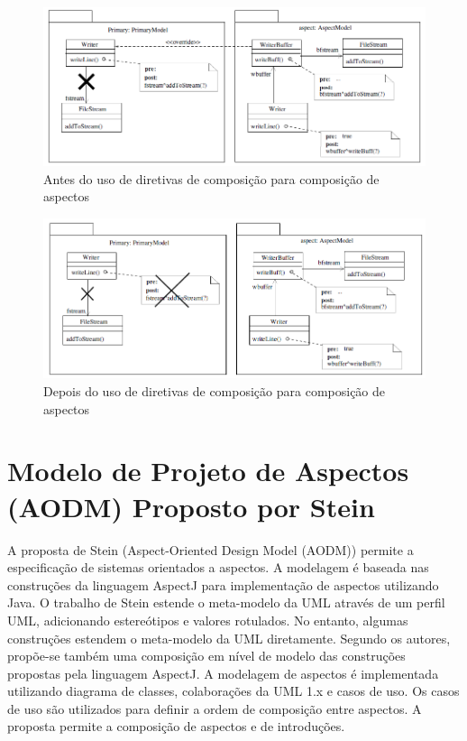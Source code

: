 \begin{landscape}
\begin{figure}
	\centering
	\includegraphics[scale=0.8]{img/clarke_1.png}
	\caption{Antes do uso de diretivas de composição para composição de aspectos}\label{fig:clarke_1}
\end{figure}
\end{landscape}

\begin{landscape}
\begin{figure}
	\centering
	\includegraphics[scale=0.8]{img/clarke_2.png}
	\caption{Depois do uso de diretivas de composição para composição de aspectos}\label{fig:clarke_2}
\end{figure}
\end{landscape}

\section{Modelo de Projeto de Aspectos (AODM) Proposto por Stein}

A proposta de Stein (Aspect-Oriented Design Model (AODM)) \cite{stein:02} \cite{Stein02onrepresenting} \cite{stein:aosd-uml02} permite a especificação
de sistemas orientados a aspectos. A modelagem é baseada nas construções da linguagem AspectJ para implementação de aspectos utilizando Java. O
trabalho de Stein estende o meta-modelo da UML através de um perfil UML, adicionando estereótipos e valores rotulados. No entanto, algumas
construções estendem o meta-modelo da UML diretamente. Segundo os autores, propõe-se também uma composição em nível de modelo das construções
propostas pela linguagem AspectJ. A modelagem de aspectos é implementada utilizando diagrama de classes, colaborações da UML 1.x e casos de uso. Os
casos de uso são utilizados para definir a ordem de composição entre aspectos. A proposta permite a composição de aspectos e de introduções.

